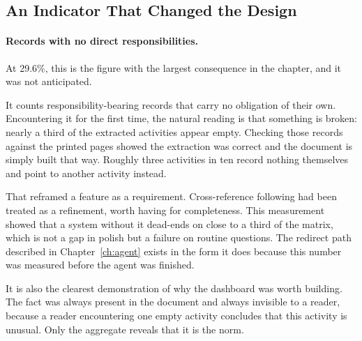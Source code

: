 \subsection{An Indicator That Changed the Design}

\paragraph{Records with no direct responsibilities.} At 29.6\%, this is the figure with the
largest consequence in the chapter, and it was not anticipated.

It counts responsibility-bearing records that carry no obligation of their own. Encountering
it for the first time, the natural reading is that something is broken: nearly a third of the
extracted activities appear empty. Checking those records against the printed pages showed the
extraction was correct and the document is simply built that way. Roughly three activities in
ten record nothing themselves and point to another activity instead.

That reframed a feature as a requirement. Cross-reference following had been treated as a
refinement, worth having for completeness. This measurement showed that a system without it
dead-ends on close to a third of the matrix, which is not a gap in polish but a failure on
routine questions. The redirect path described in Chapter~\ref{ch:agent} exists in the form it
does because this number was measured before the agent was finished.

It is also the clearest demonstration of why the dashboard was worth building. The fact was
always present in the document and always invisible to a reader, because a reader
encountering one empty activity concludes that this activity is unusual. Only the aggregate
reveals that it is the norm.

